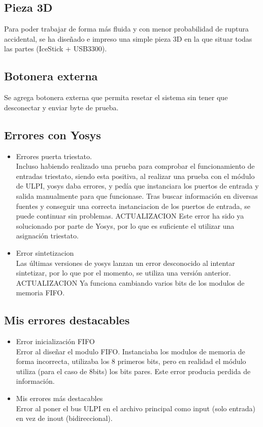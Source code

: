 \subsection{Pieza 3D}
Para poder trabajar de forma más fluida y con menor probabilidad de ruptura accidental, se ha diseñado e impreso una simple pieza 3D en la que situar todas las partes (IceStick + USB3300).

\subsection{Botonera externa}
Se agrega botonera externa que permita resetar el sistema sin tener que desconectar y enviar byte de prueba.

\subsection{Errores con Yosys}
\begin{itemize}
    \item Errores puerta triestato. \\
    Incluso habiendo realizado una prueba para comprobar el funcionamiento de entradas triestato, siendo esta positiva, al realizar una prueba con el módulo de ULPI, yosys daba errores, y pedía que instanciara los puertos de entrada y salida manualmente para que funcionase. Tras buscar información en diversas fuentes y conseguir una correcta instanciacion de los puertos de entrada, se puede continuar sin problemas. ACTUALIZACION Este error ha sido ya solucionado por parte de Yosys, por lo que es suficiente el utilizar una asignación triestato.

    \item Error sintetizacion \\
    Las últimas versiones de yosys lanzan un error desconocido al intentar sintetizar, por lo que por el momento, se utiliza una versión anterior. ACTUALIZACION Ya funciona cambiando varios bits de los modulos de memoria FIFO.
\end{itemize}

\subsection{Mis errores destacables}
\begin{itemize}
    \item Error inicialización FIFO \\
    Error al diseñar el modulo FIFO. Instanciaba los modulos de memoria de forma incorrecta, utilizaba los 8 primeros bits, pero en realidad el módulo utiliza (para el caso de 8bits) los bits pares. Este error producia perdida de información.
    
    \item Mis errores más destacables \\
    Error al poner el bus ULPI en el archivo principal como input (solo entrada) en vez de inout (bidireccional).
\end{itemize}


